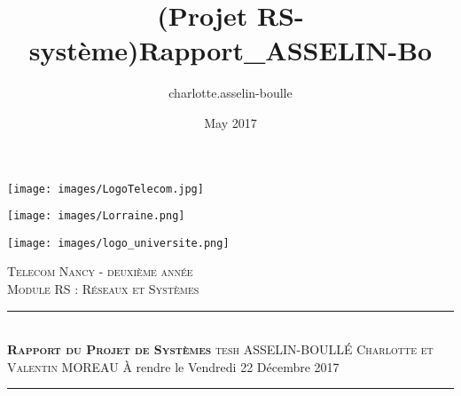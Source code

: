 \documentclass{article}
\title{(Projet RS-système)Rapport_ASSELIN-Bo}
\author{charlotte.asselin-boulle }
\date{May 2017}
\newcommand{\HRule}{\rule{\linewidth}{0.5mm}}
\begin{document}
\begin{titlepage}
\begin{minipage}[c]{5.5cm}       \texttt{[image: images/LogoTelecom.jpg]}    \end{minipage}
\begin{minipage}[c]{5.5cm}       \texttt{[image: images/Lorraine.png]}    \end{minipage}   
\begin{minipage}[c]{5.5cm}       \texttt{[image: images/logo\_universite.png]}    \end{minipage}

\bigbreak
  \begin{sffamily}
  \begin{center}
    \textsc{Telecom Nancy - deuxième année}\\[0.3cm]
    \medbreak\textsc{\Large Module RS : Réseaux et Systèmes}\\[0,2cm]
    
    \HRule \\[0,3cm]
     \Huge\textbf{\textsc{Rapport du Projet de Systèmes }}
    \medbreak
    \LARGE \textsc{tesh}
    \bigbreak
    \bigbreak
    \bigbreak
    \large \textsc{ASSELIN-BOULLÉ Charlotte et Valentin MOREAU}
     \bigbreak
     \bigbreak
    À rendre le Vendredi 22 Décembre 2017
    \bigbreak
    \HRule \\[0,6cm]
   
    
    \end{center}
    
  \end{sffamily}
\end{titlepage}


  


\newpage

\begin{centering}
\large \tableofcontents
\end{centering}


\newpage
\vspace*{2cm}
\end{document}
